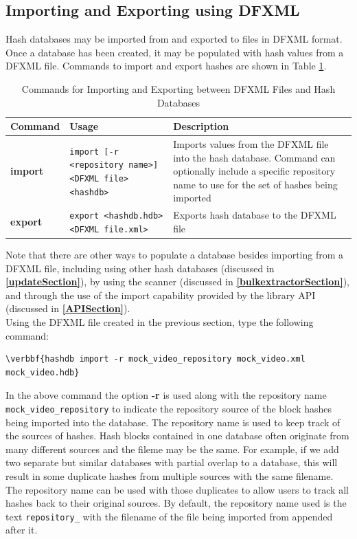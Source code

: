 \documentclass[11pt,fleqn]{article} %
\begin{document}
\subsection{Importing and Exporting using DFXML}
Hash databases may be imported from and exported to files in DFXML format.
Once a database has been created, it may be populated with hash values from a DFXML file.
Commands to import and export hashes are shown in Table \ref{tab:importExport}.
\begin{table}[!ht]
\centering
\caption{Commands for Importing and Exporting between DFXML Files and Hash Databases}
\label{tab:importExport}
\begin{tabular}{|p{2.5 cm}|p{7 cm}|p{4 cm}|}
\hline \hline
\textbf{Command} & \textbf{Usage} & \textbf{Description} \\
\hline
\textbf{import} & \verb+import [-r <repository name>]+ \verb+<DFXML file> <hashdb>+& Imports values from the DFXML file into the hash database. Command can optionally include a specific repository name to use for the set of hashes being imported\\
\hline
\textbf{export} & \verb+export <hashdb.hdb> <DFXML file.xml>+ & Exports hash database to the DFXML file\\
\hline
\end{tabular}
\end{table}
Note that there are other ways to populate a database besides importing from a DFXML file, including using other hash databases (discussed in \textbf{\autoref{updateSection}}),
by using the \bulk \hash scanner (discussed in \textbf{\autoref{bulkextractorSection}}),
and through the use of the import capability provided by the \hdb library API (discussed in \textbf{\autoref{APISection}}).\\

Using the DFXML file created in the previous section, type the following command:
\begin{Verbatim}[commandchars=\\\{\}]
\verbbf{hashdb import -r mock_video_repository mock_video.xml mock_video.hdb}
\end{Verbatim}
In the above command the option \textbf{-r} is used along with the repository name \texttt{mock\_video\_repository} to indicate the repository source of the block hashes being imported into the database. The repository name is used to keep track of the sources of hashes. Hash blocks contained in one database often originate from many different sources and the fileme may be the same. For example, if we add two separate but similar databases with partial overlap to a database, this will result in some duplicate hashes from multiple sources with the same filename. The repository name can be used with those duplicates to allow users to track all hashes back to their original sources. By default, the repository name used is the text \texttt{repository\_} with the filename of the file being imported from appended after it.\\
\end{document}
